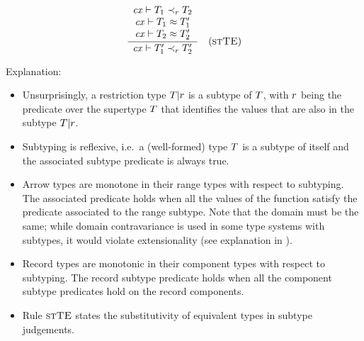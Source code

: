 

\[
\frac{\begin{array}{c}\mathit{cx}\vdash T_1\prec_{r}T_2\\\mathit{cx}\vdash T_1\approx T_1'\\\mathit{cx}\vdash T_2\approx T_2'\end{array}}{\mathit{cx}\vdash T_1'\prec_{r}T_2'}\quad\mbox{(\textsc{stTE})}
\]

Explanation:
\begin{itemize}
\item
Unsurprisingly, a restriction type $T|r$ is a subtype of $T$, with
$r$ being the predicate over the supertype $T$ that identifies the
values that are also in the subtype $T|r$.
\item
Subtyping is reflexive, i.e.\ a (well-formed) type $T$ is a subtype of
itself and the associated subtype predicate is always true.
\item
Arrow types are monotone in their range types with respect to subtyping. The
associated predicate holds when all the values of the function satisfy the
predicate associated to the range subtype. Note that the domain must be the
same; while domain contravariance is used in some type systems with subtypes,
it would violate extensionality (see explanation in \cite{pvs-seman}).
\item
Record types are monotonic in their component types with respect to
subtyping. The record subtype predicate holds when all the component subtype
predicates hold on the record components.
\item
Rule $\textsc{stTE}$ states the substitutivity of equivalent types in subtype
judgements.
\end{itemize}

